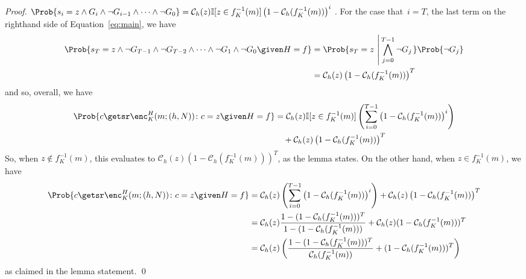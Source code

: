 \begin{proof}
$
\Prob{s_i=z \wedge G_i \wedge \neg G_{i-1} \wedge \cdots \wedge \neg G_0} = 
\mathcal{C}_h(z)\mathbb{I}[z \in f^{-1}_K(m)]\left(1 - \mathcal{C}_h(f^{-1}_K(m))\right)^i\
$.
For the case that~$i=T$, the last term on the righthand side of Equation~\ref{eq:main},
we have 
\begin{align*}
\Prob{s_T=z \wedge \neg G_{T-1} \wedge \neg G_{T-2}
  \wedge \cdots \wedge \neg G_1 \wedge \neg G_0 \given H=f} 
&= \Prob{s_T=z \, \left| \, \bigwedge_{j=0}^{T-1} \neg G_j \right.}  \Prob{\neg G_j} \\
&= \mathcal{C}_h(z)\left( 1 - \mathcal{C}_h(f^{-1}_K(m)) \right)^T
\end{align*}
and so, overall, we have 
\begin{align*}
\Prob{c\getsr\enc^H_K(m;(h,N)) \colon c=z \given H=f} &= 
\mathcal{C}_h(z) \mathbb{I}[z \in f^{-1}_K(m)] 
\left( \sum_{i=0}^{T-1}\left(1 - \mathcal{C}_h(f^{-1}_K(m))\right)^i \right) \\
&\quad + \mathcal{C}_h(z)\left( 1 - \mathcal{C}_h(f^{-1}_K(m)) \right)^T 
\end{align*}
So, when $z \not\in f^{-1}_K(m)$, this evaluates to 
$\mathcal{C}_h(z)\left( 1 - \mathcal{C}_h(f^{-1}_K(m)) \right)^T$, as the lemma states.  On the other hand, when $z \in f^{-1}_K(m)$, we have
\begin{align*}
\Prob{c\getsr\enc^H_K(m;(h,N)) \colon c=z \given H=f} &= 
\mathcal{C}_h(z)
\left( \sum_{i=0}^{T-1}\left(1 - \mathcal{C}_h(f^{-1}_K(m))\right)^i \right) 
+ \mathcal{C}_h(z)\left( 1 - \mathcal{C}_h(f^{-1}_K(m)) \right)^T \\
&= \mathcal{C}_h(z)\frac{1-(1-\mathcal{C}_h(f^{-1}_K(m)))^T}{1-(1-\mathcal{C}_h(f^{-1}_K(m)))} + \mathcal{C}_h(z) (1-\mathcal{C}_h(f^{-1}_K(m)))^T\\
&=\mathcal{C}_h(z) \left( \frac{1-(1-\mathcal{C}_h(f^{-1}_K(m)))^T}{\mathcal{C}_h(f^{-1}_K(m))}  +  (1-\mathcal{C}_h(f^{-1}_K(m)))^T \right)
\end{align*}
as claimed in the lemma statement.
\hfill\qed
\end{proof}
%

